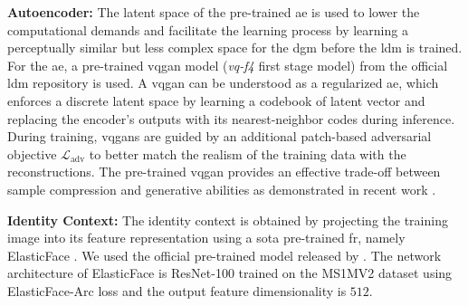 \documentclass[10pt,twocolumn,letterpaper]{article}
\begin{document}
\textbf{Autoencoder:} The latent space of the pre-trained \acrshort{ae} is used to lower the computational demands and facilitate the learning process by learning a perceptually similar but less complex space for the \acrshort{dgm} before the \acrshort{ldm} is trained. For the \acrshort{ae}, a pre-trained \acrshort{vqgan} model (\textit{vq-f4} first stage model) from the official \acrshort{ldm} \cite{Rombach2021} repository is used. A \acrshort{vqgan} can be understood as a regularized \acrshort{ae}, which enforces a discrete latent space by learning a codebook of latent vector and replacing the encoder's outputs with its nearest-neighbor codes during inference. During training, \acrshort{vqgan}s are guided by an additional patch-based adversarial objective $\mathcal{L}_{\text{adv}}$ to better match the realism of the training data with the reconstructions. The pre-trained \acrshort{vqgan} provides an effective trade-off between sample compression and generative abilities as demonstrated in recent work \cite{Rombach2021}. 


\textbf{Identity Context:} The identity context is obtained by projecting the training image into its feature representation using a \acrshort{sota} pre-trained \acrshort{fr}, namely ElasticFace \cite{ElasticFace}. We used the official pre-trained model released by \cite{ElasticFace}. 
The network architecture of ElasticFace \cite{ElasticFace} is ResNet-100 \cite{ResNet} trained on the MS1MV2 \cite{MSCeleb1MDataset,ArcFace} dataset using ElasticFace-Arc loss and the output feature dimensionality is $512$.
\end{document}
